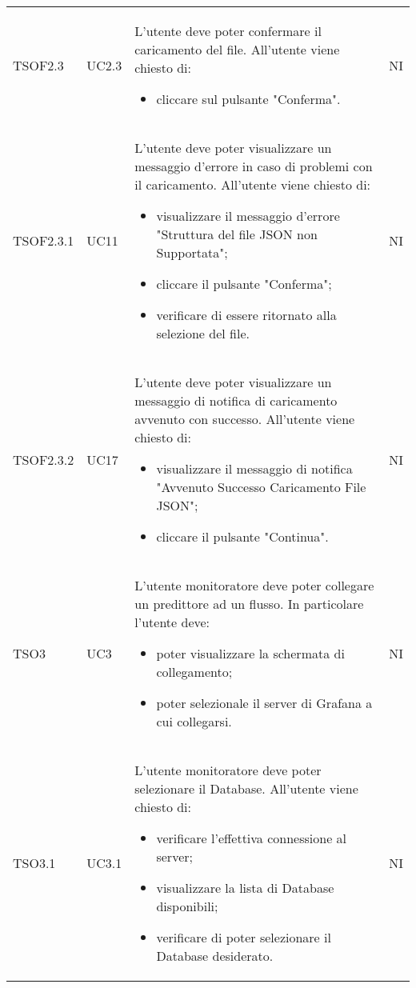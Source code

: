 \begin{longtable}{C{2.5cm} C{2.5cm} L{8cm} C{2cm}}
TSOF2.3 & UC2.3 &
L'utente deve poter confermare il caricamento del file. \newline All'utente viene chiesto di:
\begin{itemize}
	\item cliccare sul pulsante "Conferma".
\end{itemize} & NI	\\


TSOF2.3.1 & UC11 &
L'utente deve poter visualizzare un messaggio d'errore in caso di problemi con il caricamento. \newline All'utente viene chiesto di:
\begin{itemize}
	\item visualizzare il messaggio d'errore "Struttura del file JSON non Supportata";
	\item cliccare il pulsante "Conferma";
	\item verificare di essere ritornato alla selezione del file.
\end{itemize} & NI	\\

TSOF2.3.2 & UC17 &
L'utente deve poter visualizzare un messaggio di notifica di caricamento avvenuto con successo. \newline All'utente viene chiesto di:
\begin{itemize}
	\item visualizzare il messaggio di notifica "Avvenuto Successo Caricamento File JSON";
	\item cliccare il pulsante "Continua".
\end{itemize} & NI	\\
TSO3 & 
UC3 &
L'utente monitoratore deve poter collegare un predittore ad un flusso. In particolare l'utente deve:
\begin{itemize}
	\item poter visualizzare la schermata di collegamento;
	\item poter selezionale il server di Grafana a cui collegarsi.
\end{itemize} &
NI \\ 

TSO3.1 &
UC3.1 &
L'utente monitoratore deve poter selezionare il Database. All'utente viene chiesto di:
\begin{itemize}
	\item verificare l'effettiva connessione al server;
	\item visualizzare la lista di Database disponibili;
	\item verificare di poter selezionare il Database desiderato.
\end{itemize}&
NI \\


\end{longtable}
